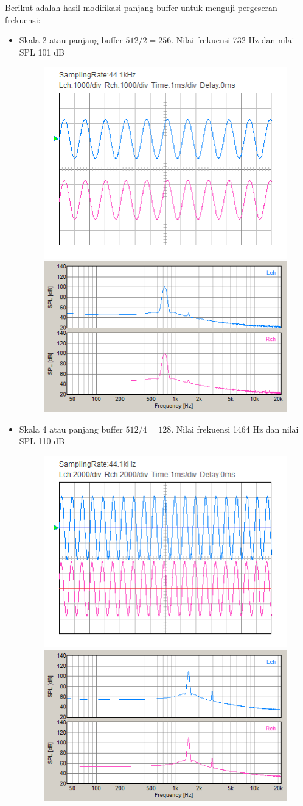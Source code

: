 \documentclass[12pt,]{article}
\begin{document}
  	\newpage
  	Berikut adalah hasil modifikasi panjang buffer untuk menguji pergeseran frekuensi:
  	\begin{itemize}
  		\item Skala 2 atau panjang buffer $512/2 = 256$.
  		Nilai frekuensi 732 Hz dan nilai SPL 101 dB
  		\begin{figure}[H]
  			\centering
  			\includegraphics[width=0.45\linewidth]{result/day_4/osi_sine2}
  			\includegraphics[width=0.45\linewidth]{result/day_4/fft_sine2}
  		\end{figure}
  	
  		\item Skala 4 atau panjang buffer $512/4 = 128$.
  		Nilai frekuensi 1464 Hz dan nilai SPL 110 dB
  		\begin{figure}[H]
  			\centering
  			\includegraphics[width=0.45\linewidth]{result/day_4/osi_sine4}
  			\includegraphics[width=0.45\linewidth]{result/day_4/fft_sine4}
  		\end{figure}
  	

\end{itemize}
\end{document}
